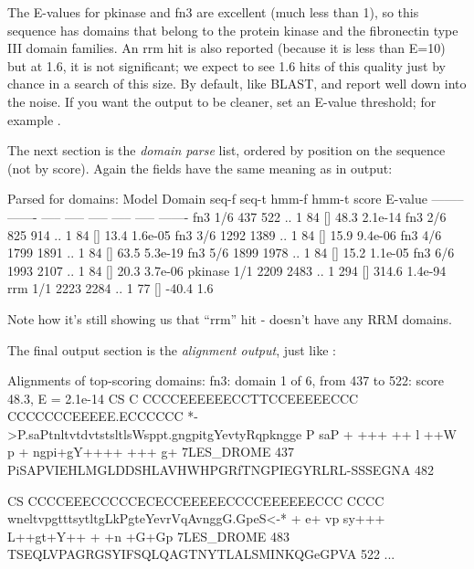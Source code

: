 The E-values for pkinase and fn3 are excellent (much less than 1), so
this sequence has domains that belong to the protein kinase and the
fibronectin type III domain families. An rrm hit is also reported
(because it is less than E=10) but at 1.6, it is not significant; we
expect to see 1.6 hits of this quality just by chance in a search of
this size. By default, like BLAST,  and 
report well down into the noise. If you want the output to be cleaner,
set an E-value threshold; for example .

The next section is the \emph{domain parse} list, ordered by position
on the sequence (not by score). Again the fields have the same meaning
as in  output:

\begin{sreoutput}
Parsed for domains:
Model    Domain  seq-f seq-t    hmm-f hmm-t      score  E-value
-------- ------- ----- -----    ----- -----      -----  -------
fn3        1/6     437   522 ..     1    84 []    48.3  2.1e-14
fn3        2/6     825   914 ..     1    84 []    13.4  1.6e-05
fn3        3/6    1292  1389 ..     1    84 []    15.9  9.4e-06
fn3        4/6    1799  1891 ..     1    84 []    63.5  5.3e-19
fn3        5/6    1899  1978 ..     1    84 []    15.2  1.1e-05
fn3        6/6    1993  2107 ..     1    84 []    20.3  3.7e-06
pkinase    1/1    2209  2483 ..     1   294 []   314.6  1.4e-94
rrm        1/1    2223  2284 ..     1    77 []   -40.4      1.6
\end{sreoutput}

Note how it's still showing us that ``rrm'' hit - 
doesn't have any RRM domains. 

The final output section is the \emph{alignment output}, just like
:

\begin{sreoutput}
Alignments of top-scoring domains:
fn3: domain 1 of 6, from 437 to 522: score 48.3, E = 2.1e-14
                CS    C CCCCEEEEEECCTTCCEEEEECCC CCCCCCCEEEEE.ECCCCCC
                   *->P.saPtnltvtdvtstsltlsWsppt.gngpitgYevtyRqpkngge
                      P saP   + +++ ++ l ++W p +  ngpi+gY++++ +++ g+ 
  7LES_DROME   437    PiSAPVIEHLMGLDDSHLAVHWHPGRfTNGPIEGYRLRL-SSSEGNA 482  

                CS CCCCEEECCCCCECECCEEEEECCCCEEEEEECCC CCCC   
                   wneltvpgtttsytltgLkPgteYevrVqAvnggG.GpeS<-*
                   + e+ vp    sy+++ L++gt+Y++ +  +n +G+Gp     
  7LES_DROME   483 TSEQLVPAGRGSYIFSQLQAGTNYTLALSMINKQGeGPVA    522  
...
\end{sreoutput}

